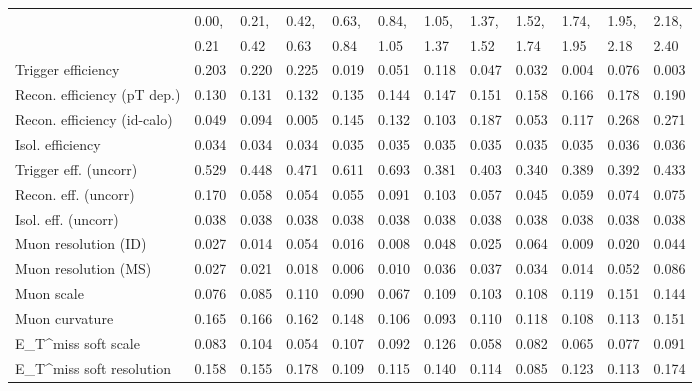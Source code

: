 \begin{tabular}{l|p{0.6cm}p{0.6cm}p{0.6cm}p{0.6cm}p{0.6cm}p{0.6cm}p{0.6cm}p{0.6cm}p{0.6cm}p{0.6cm}p{0.6cm}}
\hline
   & 0.00, & 0.21, & 0.42, & 0.63, & 0.84, & 1.05, & 1.37, & 1.52, & 1.74, & 1.95, & 2.18,  \\ 
   & 0.21 & 0.42 & 0.63 & 0.84 & 1.05 & 1.37 & 1.52 & 1.74 & 1.95 & 2.18 & 2.40  \\ 
\hline
Trigger efficiency                       & 0.203 & 0.220 & 0.225 & 0.019 & 0.051 & 0.118 & 0.047 & 0.032 & 0.004 & 0.076 & 0.003 \\
Recon. efficiency (pT dep.)              & 0.130 & 0.131 & 0.132 & 0.135 & 0.144 & 0.147 & 0.151 & 0.158 & 0.166 & 0.178 & 0.190 \\
Recon. efficiency (id-calo)              & 0.049 & 0.094 & 0.005 & 0.145 & 0.132 & 0.103 & 0.187 & 0.053 & 0.117 & 0.268 & 0.271 \\
Isol. efficiency                         & 0.034 & 0.034 & 0.034 & 0.035 & 0.035 & 0.035 & 0.035 & 0.035 & 0.035 & 0.036 & 0.036 \\
Trigger eff. (uncorr)                    & 0.529 & 0.448 & 0.471 & 0.611 & 0.693 & 0.381 & 0.403 & 0.340 & 0.389 & 0.392 & 0.433 \\
Recon. eff. (uncorr)                     & 0.170 & 0.058 & 0.054 & 0.055 & 0.091 & 0.103 & 0.057 & 0.045 & 0.059 & 0.074 & 0.075 \\
Isol. eff. (uncorr)                      & 0.038 & 0.038 & 0.038 & 0.038 & 0.038 & 0.038 & 0.038 & 0.038 & 0.038 & 0.038 & 0.038 \\
Muon resolution (ID)                     & 0.027 & 0.014 & 0.054 & 0.016 & 0.008 & 0.048 & 0.025 & 0.064 & 0.009 & 0.020 & 0.044 \\
Muon resolution (MS)                     & 0.027 & 0.021 & 0.018 & 0.006 & 0.010 & 0.036 & 0.037 & 0.034 & 0.014 & 0.052 & 0.086 \\
Muon scale                               & 0.076 & 0.085 & 0.110 & 0.090 & 0.067 & 0.109 & 0.103 & 0.108 & 0.119 & 0.151 & 0.144 \\
Muon curvature                           & 0.165 & 0.166 & 0.162 & 0.148 & 0.106 & 0.093 & 0.110 & 0.118 & 0.108 & 0.113 & 0.151 \\
E_{T}^{miss} soft scale                  & 0.083 & 0.104 & 0.054 & 0.107 & 0.092 & 0.126 & 0.058 & 0.082 & 0.065 & 0.077 & 0.091 \\
E_{T}^{miss} soft resolution             & 0.158 & 0.155 & 0.178 & 0.109 & 0.115 & 0.140 & 0.114 & 0.085 & 0.123 & 0.113 & 0.174 \\

\end{tabular}
